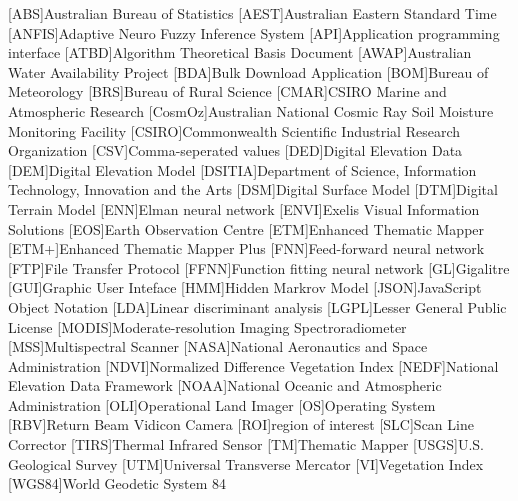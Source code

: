 \begin{acronym}[UML]
[ABS]{Australian Bureau of Statistics}
[AEST]{Australian Eastern Standard Time}
[ANFIS]{Adaptive Neuro Fuzzy Inference System}
[API]{Application programming interface}
[ATBD]{Algorithm Theoretical Basis Document}
[AWAP]{Australian Water Availability Project}
[BDA]{Bulk Download Application}
[BOM]{Bureau of Meteorology}
[BRS]{Bureau of Rural Science}
[CMAR]{CSIRO Marine and Atmospheric Research}
[CosmOz]{Australian National Cosmic Ray Soil Moisture Monitoring Facility}
[CSIRO]{Commonwealth Scientific Industrial Research Organization}
[CSV]{Comma-seperated values}
[DED]{Digital Elevation Data}
[DEM]{Digital Elevation Model}
[DSITIA]{Department of Science, Information Technology, Innovation and the Arts}
[DSM]{Digital Surface Model}
[DTM]{Digital Terrain Model}
[ENN]{Elman neural network}
[ENVI]{Exelis Visual Information Solutions}
[EOS]{Earth Observation Centre}
[ETM]{Enhanced Thematic Mapper}
[ETM+]{Enhanced Thematic Mapper Plus}
[FNN]{Feed-forward neural network}
[FTP]{File Transfer Protocol}
[FFNN]{Function fitting neural network}
[GL]{Gigalitre}
[GUI]{Graphic User Inteface}
[HMM]{Hidden Markrov Model}
[JSON]{JavaScript Object Notation}
[LDA]{Linear discriminant analysis}
[LGPL]{Lesser General Public License}
[MODIS]{Moderate-resolution Imaging Spectroradiometer} 
[MSS]{Multispectral Scanner}
[NASA]{National Aeronautics and Space Administration}
[NDVI]{Normalized Difference Vegetation Index}
[NEDF]{National Elevation Data Framework}
[NOAA]{National Oceanic and Atmospheric Administration}
[OLI]{Operational Land Imager}
[OS]{Operating System}
[RBV]{Return Beam Vidicon Camera}
[ROI]{region of interest}  
[SLC]{Scan Line Corrector}
[TIRS]{Thermal Infrared Sensor} 
[TM]{Thematic Mapper}
[USGS]{U.S. Geological Survey}
[UTM]{Universal Transverse Mercator}
[VI]{Vegetation Index}
[WGS84]{World Geodetic System 84}
\end{acronym}  
                   
\endgroup

\cleardoublepage